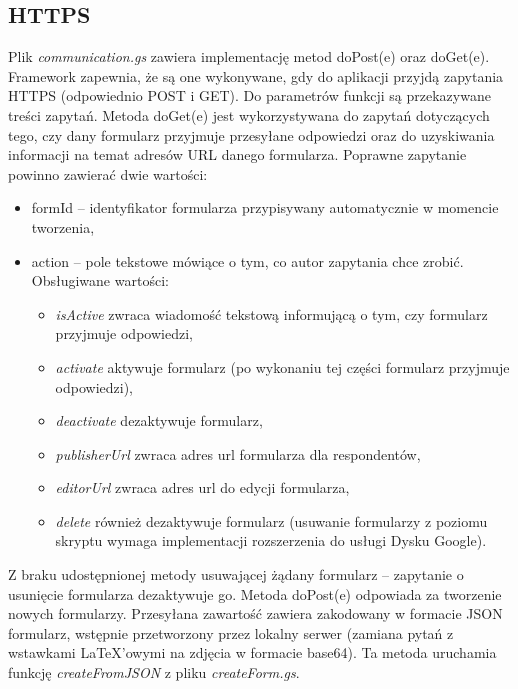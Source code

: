 \subsection{HTTPS}
Plik \textit{communication.gs} zawiera implementację metod doPost(e) oraz doGet(e). Framework zapewnia, że są one wykonywane, gdy do aplikacji przyjdą zapytania HTTPS (odpowiednio POST i GET). Do parametrów funkcji są przekazywane treści zapytań.
\ind Metoda doGet(e) jest wykorzystywana do zapytań dotyczących tego, czy dany formularz przyjmuje przesyłane odpowiedzi oraz do uzyskiwania informacji na temat adresów URL danego formularza.  Poprawne zapytanie powinno zawierać dwie wartości:
\begin{itemize}
\item formId -- identyfikator formularza przypisywany automatycznie w momencie tworzenia,
\item action -- pole tekstowe mówiące o tym, co autor zapytania chce zrobić. Obsługiwane wartości:
\begin{itemize}
\item \textit{isActive} zwraca wiadomość tekstową informującą o tym, czy formularz przyjmuje odpowiedzi,
\item \textit{activate} aktywuje formularz (po wykonaniu tej części formularz przyjmuje odpowiedzi),
\item \textit{deactivate} dezaktywuje formularz,
\item \textit{publisherUrl} zwraca adres url formularza dla respondentów,
\item \textit{editorUrl} zwraca adres url do edycji formularza,
\item \textit{delete} również dezaktywuje formularz (usuwanie formularzy z poziomu skryptu wymaga implementacji rozszerzenia do usługi Dysku Google).
\end{itemize}
\end{itemize}
Z braku udostępnionej metody usuwającej żądany formularz -- zapytanie o usunięcie formularza dezaktywuje go. 
\ind Metoda doPost(e) odpowiada  za tworzenie nowych formularzy. Przesyłana zawartość zawiera zakodowany w formacie JSON formularz, wstępnie przetworzony przez lokalny serwer (zamiana pytań z wstawkami \LaTeX{}'owymi na zdjęcia w formacie base64). Ta metoda uruchamia funkcję \textit{createFromJSON} z pliku \textit{createForm.gs}.
